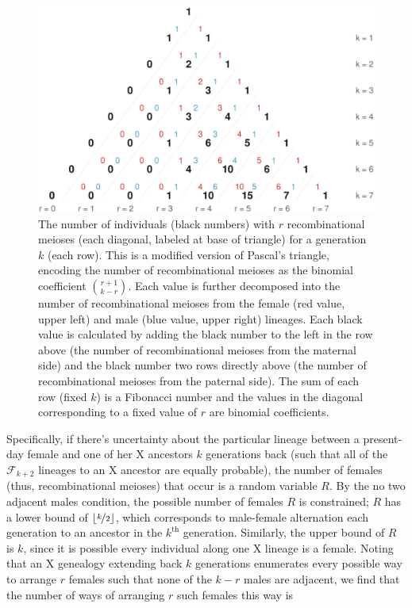 \documentclass[9pt,twocolumn,twoside]{gsajnl}
\begin{document}
\begin{figure}[!ht]
  \centering
  \includegraphics[width=\linewidth]{images/bifib}

  \caption{The number of individuals (black numbers) with $r$ recombinational
    meioses (each diagonal, labeled at base of triangle) for a generation $k$
    (each row). This is a modified version of Pascal's triangle, encoding the
    number of recombinational meioses as the binomial coefficient ${r + 1
    \choose k - r}$. Each value is further decomposed into the number of
    recombinational meioses from the female (red value, upper left) and male
    (blue value, upper right) lineages. Each black value is calculated by adding
    the black number to the left in the row above (the number of
    recombinational meioses from the maternal side) and the black number two
    rows directly above (the number of recombinational meioses from the
  paternal side). The sum of each row (fixed $k$) is a Fibonacci number and the
values in the diagonal corresponding to a fixed value of $r$ are binomial
coefficients.}

  \label{fig:pascals-bifib}

\end{figure}

Specifically, if there's uncertainty about the particular lineage between a
present-day female and one of her X ancestors $k$ generations back (such that
all of the $\mathcal{F}_{k+2}$ lineages to an X ancestor are equally probable),
the number of females (thus, recombinational meioses) that occur is a random
variable $R$. By the no two adjacent males condition, the possible number of
females $R$ is constrained; $R$ has a lower bound of $\lfloor \nicefrac{k}{2}
\rfloor$, which corresponds to male-female alternation each generation to an
ancestor in the $k^\text{th}$ generation. Similarly, the upper bound of $R$ is
$k$, since it is possible every individual along one X lineage is a female.
Noting that an X genealogy extending back $k$ generations enumerates every
possible way to arrange $r$ females such that none of the $k-r$ males are
adjacent, we find that the number of ways of arranging $r$ such females this
way is
\end{document}
